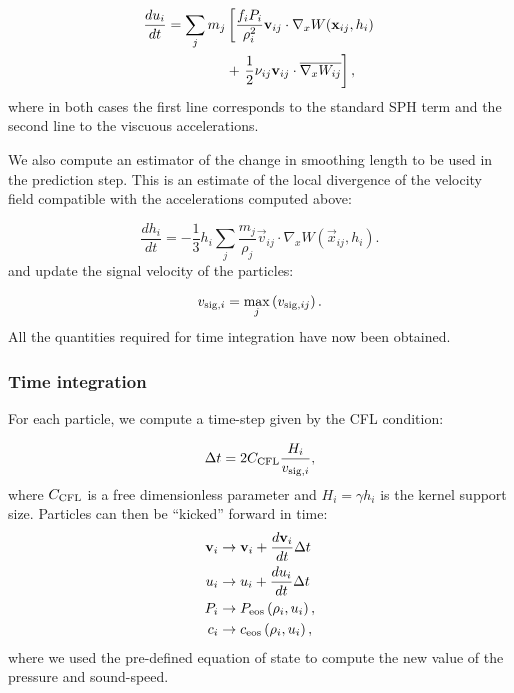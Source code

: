 \begin{align}
  \frac{du_i}{dt} = \sum_j m_j &\left[\frac{f_iP_i}{\rho_i^2}  \vec{v}_{ij}
    \cdot \nabla_x W(\vec{x}_{ij}, h_i) \right. \label{eq:sph:minimal:du_dt}\\
    &+\left. \frac{1}{2}\nu_{ij}\vec{v}_{ij}\cdot\Big. \Wij\right], \nonumber
\end{align}
where in both cases the first line corresponds to the standard SPH
term and the second line to the viscuous accelerations.

We also compute an estimator of the change in smoothing length to be
used in the prediction step. This is an estimate of the local
divergence of the velocity field compatible with the accelerations
computed above:

\begin{equation}
  \frac{dh_i}{dt} = -\frac{1}{3}h_i \sum_j \frac{m_j}{\rho_j}
  \vec{v}_{ij}\cdot \nabla_x W(\vec{x}_{ij}, h_i).
  \label{eq:sph:minimal:dh_dt}
\end{equation}
and update the signal velocity of the particles:

\begin{equation}
  v_{{\rm sig},i} = \max_j \left( v_{{\rm sig},ij} \right).
  \label{eq:sph:minimal:v_sig_update}
\end{equation}
All the quantities required for time integration have now been obtained.

\subsubsection{Time integration}

For each particle, we compute a time-step given by the CFL condition:

\begin{equation}
  \Delta t = 2 C_{\rm CFL} \frac{H_i}{v_{{\rm sig},i}},
    \label{eq:sph:minimal:dt}
\end{equation}
where $C_{\rm CFL}$ is a free dimensionless parameter and $H_i = \gamma h_i$ is the
kernel support size. Particles can then be ``kicked'' forward in time:
\begin{align}
  \vec{v}_i &\rightarrow \vec{v}_i + \frac{d\vec{v}_i}{dt} \Delta t  \label{eq:sph:minimal:kick_v}\\
  u_i &\rightarrow u_i + \frac{du_i}{dt} \Delta t \label{eq:sph:minimal:kick_u}\\
  P_i &\rightarrow P_{\rm eos}\left(\rho_i, u_i\right) \label{eq:sph:minimal:kick_P}, \\
  c_i &\rightarrow c_{\rm eos}\left(\rho_i, u_i\right) \label{eq:sph:minimal:kick_c},
\end{align}
where we used the pre-defined equation of state to compute the new
value of the pressure and sound-speed.

